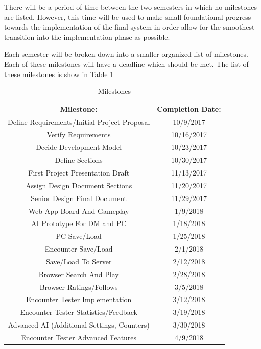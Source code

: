 \documentclass[12pt,a4paper]{report}
\begin{document}
	There will be a period of time between the two semesters in which no milestones are listed. However, this time will be used to make small foundational progress towards the implementation of the final system in order allow for the smoothest transition into the implementation phase as possible. 
	
	Each semester will be broken down into a smaller organized list of milestones. Each of these milestones will have a deadline which should be met. The list of these milestones is show in Table \ref{table: milestones}
	
	\begin{table}[H]
		\begin{center}
			\begin{tabular}{ |c|c| } 
				\hline
				Milestone: & Completion Date: \\
				\hline
				Define Requirements/Initial Project Proposal & 10/9/2017 \\
				Verify Requirements & 10/16/2017 \\
				Decide Development Model & 10/23/2017 \\
				Define Sections & 10/30/2017 \\
				First Project Presentation Draft & 11/13/2017 \\
				Assign Design Document Sections & 11/20/2017 \\
				Senior Design Final Document & 11/29/2017 \\
				Web App Board And Gameplay & 1/9/2018 \\
				AI Prototype For DM and PC & 1/18/2018 \\ 
				PC Save/Load & 1/25/2018 \\
				Encounter Save/Load & 2/1/2018 \\
				Save/Load To Server & 2/12/2018 \\
				Browser Search And Play & 2/28/2018 \\
				Browser Ratings/Follows & 3/5/2018 \\
				Encounter Tester Implementation & 3/12/2018 \\
				Encounter Tester Statistics/Feedback & 3/19/2018 \\
				Advanced AI (Additional Settings, Counters) & 3/30/2018 \\
				Encounter Tester Advanced Features & 4/9/2018 \\	
				\hline
			\end{tabular}
		\end{center}
		\caption{Milestones} \label{table: milestones}
	\end{table}
	
\end{document}

